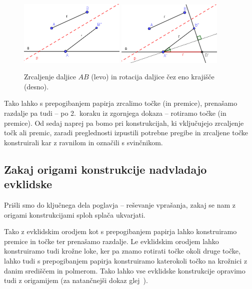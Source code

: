 \begin{dokaz}
    \begin{figure}[h]
        \centering
        \includegraphics[width=0.45\textwidth]{images/zrcaljenje_korak1.png}
        \includegraphics[width=0.45\textwidth]{images/zrcaljenje_korak2.png}
        \caption[Prenašanje razdalj z origamijem po korakih]{Zrcaljenje daljice $AB$ (levo) in rotacija daljice čez eno krajišče (desno).}
        \label{fig:prenos_razdalje_koraki}
    \end{figure}
\end{dokaz}

Tako lahko s prepogibanjem papirja zrcalimo točke (in premice), prenašamo razdalje pa tudi -- po 2.\ koraku iz zgornjega dokaza -- rotiramo točke (in premice). Od sedaj naprej pa bomo pri konstrukcijah, ki vključujejo zrcaljenje točk ali premic, zaradi preglednosti izpustili potrebne pregibe in zrcaljene točke konstruirali kar z ravnilom in označili s svinčnikom.

\subsection{Zakaj origami konstrukcije nadvladajo evklidske}
\label{podpogl:nadvlada_origamija}

Prišli smo do ključnega dela poglavja -- reševanje vprašanja, zakaj se nam z origami konstrukcijami sploh splača ukvarjati.

Tako z evklidskim orodjem kot s prepogibanjem papirja lahko konstruiramo premice in točke ter prenašamo razdalje. Le evklidskim orodjem lahko konstruiramo tudi krožne loke, ker pa znamo rotirati točke okoli druge točke, lahko tudi s prepogibanjem papirja konstruiramo katerokoli točko na krožnici z danim središčem in polmerom. Tako lahko vse evklidske konstrukcije opravimo tudi z origamijem (za natančnejši dokaz glej~\cite[str.\ 362--365]{geret1995}).

